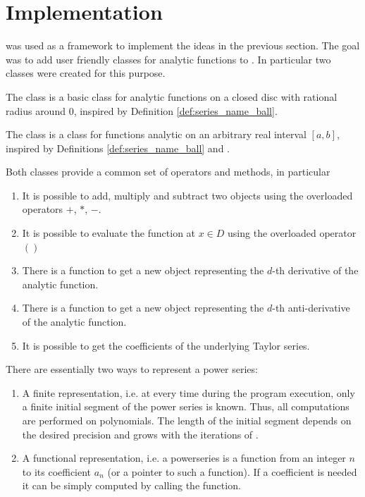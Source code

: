 	\section{Implementation}
		\irram was used as a framework to implement the ideas in the previous section.
		The goal was to add user friendly classes for analytic functions to \irram.
		In particular two classes were created for this purpose.

		The class \baana is a basic class for analytic functions on 
		a closed disc with rational radius around $0$, inspired by Definition \ref{def:series_name_ball}.

		The class \anarect is a class for functions analytic on an arbitrary real interval $[a,b]$, 
		inspired by Definitions \ref{def:series_name_ball} and \label{def:series_name_rect}.

		Both classes provide a common set of operators and methods, in particular
		\begin{enumerate}
			\item It is possible to add, multiply and subtract two objects using the overloaded operators $+$, $*$, $-$.
			\item It is possible to evaluate the function at $x \in D$ using the overloaded operator $()$
			\item There is a function  to get a new object representing the $d$-th derivative of the analytic function.
			\item There is a function  to get a new object representing the $d$-th anti-derivative of the analytic function.
			\item It is possible to get the coefficients of the underlying Taylor series.
		\end{enumerate}

		There are essentially two ways to represent a power series:
		\begin{enumerate}
			\item A finite representation, i.e. at every time during the program execution, 
			only a finite initial segment of the power series is known. 
			Thus, all computations are performed on polynomials. 
			The length of the initial segment depends on the desired precision and grows 
			with the iterations of \irram.
			\item A functional representation, i.e. a powerseries is a function from an integer $n$ to its coefficient
			$a_n$ (or a pointer to such a function). If a coefficient is needed it can be simply computed by calling the function.
		\end{enumerate}
		
